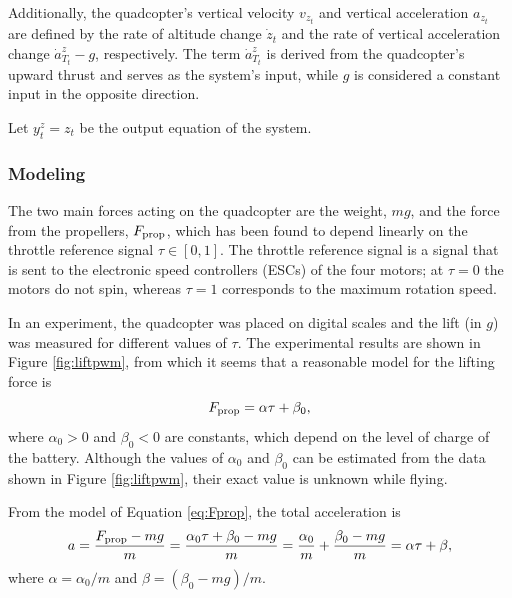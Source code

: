 \documentclass{article}
\begin{document}
Additionally, the quadcopter's vertical velocity \( v_{z_t} \) and vertical acceleration \( a_{z_t} \) are defined by the rate of altitude change \( \dot{z}_t \) and the rate of vertical acceleration change \( \dot{a}^z_{T_t} - g \), respectively. The term \( \dot{a}^z_{T_t} \) is derived from the quadcopter's upward thrust and serves as the system's input, while \( g \) is considered a constant input in the opposite direction.

Let \( y_{t}^z = z_t \) be the output equation of the system. 
\subsubsection*{Modeling}
  The two main forces acting on the quadcopter are the weight, $mg$,
  and the force from the propellers, $F_{\rm prop}$, which has been
  found to depend linearly on the throttle reference signal $\tau\in[0,1]$.
  The throttle reference signal is a signal that is sent to the
  electronic speed controllers (ESCs) of the four motors; at $\tau=0$
  the motors do not spin, whereas $\tau=1$ corresponds to the maximum
  rotation speed.
  
  In an experiment, the quadcopter was placed on digital scales and the
  lift (in $\unit{g}$) was measured for different values of $\tau$.
  The experimental results are shown in Figure \ref{fig:liftpwm}, from
  which it seems that a reasonable model for the lifting force is
  \begin{equation}
    F_{\rm prop} = \alpha \tau + \beta_0,
    \label{eq:Fprop}
  \end{equation}
  where $\alpha_0>0$ and $\beta_0<0$ are constants, which depend on the level of
  charge of the battery. Although the values of $\alpha_0$ and $\beta_0$ can be
  estimated from the data shown in Figure \ref{fig:liftpwm}, their exact
  value is unknown while flying.
  
  From the model of Equation \eqref{eq:Fprop}, the total acceleration is
  \begin{equation}
    a
    {}={}
    \frac{F_{\rm prop} - mg}{m}
    {}={}
    \frac{\alpha_0 \tau + \beta_0 - mg}{m}
    {}={}
    \frac{\alpha_0}{m} + \frac{\beta_0 - mg}{m}
    {}={}
    \alpha \tau + \beta,
  \end{equation}
  where $\alpha = \alpha_0/m$ and $\beta = (\beta_0 - mg) / m$.
  
\end{document}
